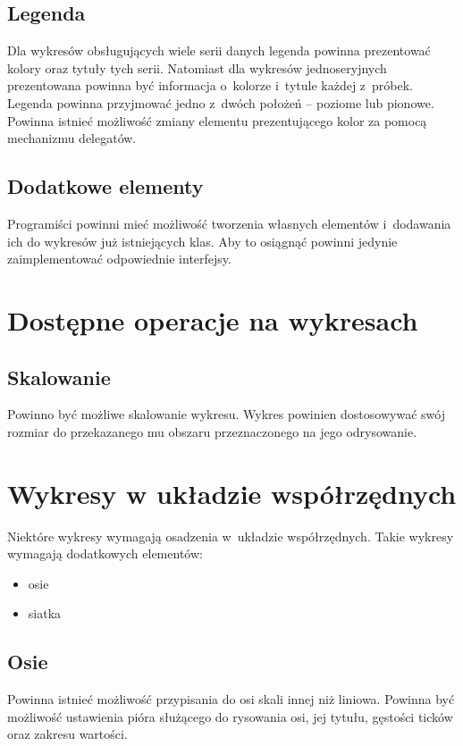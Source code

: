 \subsection{Legenda}
Dla wykresów obsługujących wiele serii danych legenda powinna prezentować kolory oraz tytuły tych serii. Natomiast dla wykresów jednoseryjnych prezentowana powinna być informacja o~kolorze i~tytule każdej z~próbek. Legenda powinna przyjmować jedno z~dwóch położeń -- poziome lub pionowe. Powinna istnieć możliwość zmiany elementu prezentującego kolor za pomocą mechanizmu delegatów.

\subsection{Dodatkowe elementy}
Programiści powinni mieć możliwość tworzenia własnych elementów i~dodawania ich do wykresów już istniejących klas. Aby to osiągnąć powinni jedynie zaimplementować odpowiednie interfejsy.


\section{Dostępne operacje na wykresach}
\subsection{Skalowanie}
Powinno być możliwe skalowanie wykresu. Wykres powinien dostosowywać swój rozmiar do przekazanego mu obszaru przeznaczonego na jego odrysowanie.



\section{Wykresy w układzie współrzędnych}
Niektóre wykresy wymagają osadzenia w~układzie współrzędnych. Takie wykresy wymagają dodatkowych elementów:

\begin{itemize}
\item{osie}
\item{siatka}
\end{itemize}

\subsection{Osie}
Powinna istnieć możliwość przypisania do osi skali innej niż liniowa.
Powinna być możliwość ustawienia pióra służącego do rysowania osi, jej tytułu, gęstości ticków oraz zakresu wartości. 

